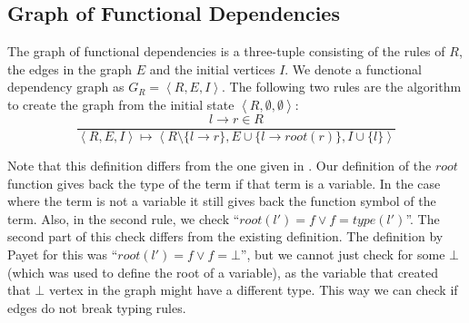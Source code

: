 \subsection*{Graph of Functional Dependencies}
The graph of functional dependencies is a three-tuple consisting of the rules of $R$, the edges in the graph $E$ and the initial vertices $I$. We denote a functional dependency graph as $G_R = \left< R, E, I \right>$. The following two rules are the algorithm to create the graph from the initial state $\left<R, \emptyset, \emptyset\right>$:
\[
\frac{l \rightarrow r \in R}{\left< R, E, I \right> \mapsto \left< R \setminus \{ l \rightarrow r\}, E \cup \{ l \rightarrow \textit{root}(r) \}, I \cup \{ l \} \right>}
\]
\begin{center}
\end{center}
Note that this definition differs from the one given in \cite{Payet:Unfolding}. Our definition of the $\textit{root}$ function gives back the type of the term if that term is a variable. In the case where the term is not a variable it still gives back the function symbol of the term. Also, in the second rule, we check ``$\textit{root}(l') = f \lor f = \textit{type}(l')$''. The second part of this check differs from the existing definition. The definition by Payet for this was ``$\textit{root}(l') = f \lor f = \bot$'', but we cannot just check for some $\bot$ (which was used to define the root of a variable), as the variable that created that $\bot$ vertex in the graph might have a different type. This way we can check if edges do not break typing rules. 

